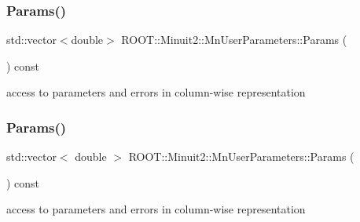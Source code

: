 \subsubsection{\texorpdfstring{Params()}{Params()}\hspace{0.1cm}{\footnotesize\ttfamily [2/3]}}
{\footnotesize\ttfamily std\+::vector$<$double$>$ R\+O\+O\+T\+::\+Minuit2\+::\+Mn\+User\+Parameters\+::\+Params (\begin{DoxyParamCaption}{ }\end{DoxyParamCaption}) const}



access to parameters and errors in column-\/wise representation 

\mbox{\label{classROOT_1_1Minuit2_1_1MnUserParameters_a0f718b770e7fbeb503f83d8f27ca10f0}} 
\subsubsection{\texorpdfstring{Params()}{Params()}\hspace{0.1cm}{\footnotesize\ttfamily [3/3]}}
{\footnotesize\ttfamily std\+::vector$<$ double $>$ R\+O\+O\+T\+::\+Minuit2\+::\+Mn\+User\+Parameters\+::\+Params (\begin{DoxyParamCaption}{ }\end{DoxyParamCaption}) const}



access to parameters and errors in column-\/wise representation 

